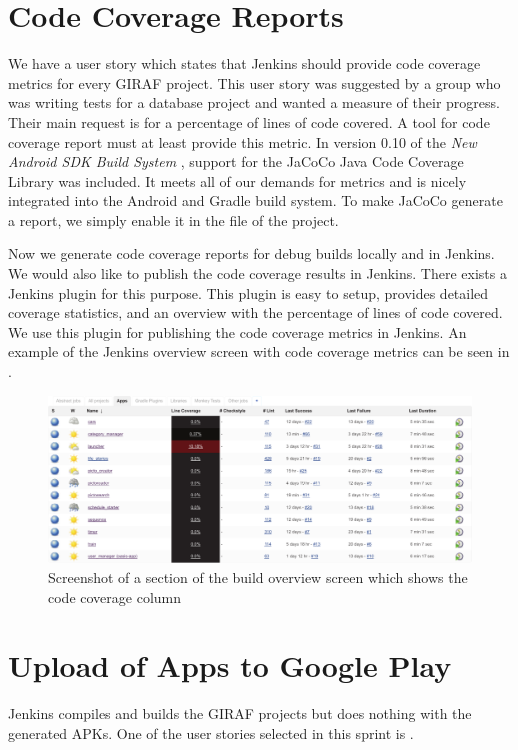 \section{Code Coverage Reports}\label{sec:s3_linecoverage}
We have a user story which states that Jenkins should provide code coverage metrics for every GIRAF project. This user story was suggested by a group who was writing tests for a database project and wanted a measure of their progress. Their main request is for a percentage of lines of code covered. A tool for code coverage report must at least provide this metric. In version 0.10 of the \emph{New Android SDK Build System} \parencite{new-build-android}, support for the JaCoCo \parencite{jacoco-home} Java Code Coverage Library was included. It meets all of our demands for metrics and is nicely integrated into the Android and Gradle build system. To make JaCoCo generate a report, we simply enable it in the  file of the project.

Now we generate code coverage reports for debug builds locally and in Jenkins. We would also like to publish the code coverage results in Jenkins. There exists a Jenkins plugin \parencite{jacoco-jenkins-plugin} for this purpose. This plugin is easy to setup, provides detailed coverage statistics, and an overview with the percentage of lines of code covered. We use this plugin for publishing the code coverage metrics in Jenkins. An example of the Jenkins overview screen with code coverage metrics can be seen in .

\begin{figure}[tbp]
    \includegraphics[width=\textwidth]{graphics/jenkins-overview-coco.pdf}
    \caption{Screenshot of a section of the build overview screen which shows the code coverage column}
    \label{fig:jenkins-overview-coco}
\end{figure}

\section{Upload of Apps to Google Play}\label{sec:upload_google_play}
Jenkins compiles and builds the GIRAF projects but does nothing with the generated APKs. One of the user stories selected in this sprint is .

